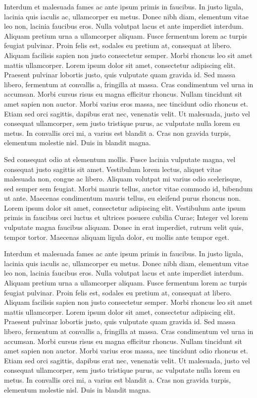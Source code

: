 Interdum et malesuada fames ac ante ipsum primis in faucibus. In justo ligula, 
lacinia quis iaculis ac, ullamcorper eu metus. Donec nibh diam, elementum vitae 
leo non, lacinia faucibus eros. Nulla volutpat lacus et ante imperdiet 
interdum. Aliquam pretium urna a ullamcorper aliquam. Fusce fermentum lorem ac 
turpis feugiat pulvinar. Proin felis est, sodales eu pretium at, consequat at 
libero. Aliquam facilisis sapien non justo consectetur semper. Morbi rhoncus 
leo sit amet mattis ullamcorper.
Lorem ipsum dolor sit amet, consectetur adipiscing elit. Praesent pulvinar 
lobortis justo, quis vulputate quam gravida id. Sed massa libero, fermentum at 
convallis a, fringilla at massa. Cras condimentum vel urna in accumsan. Morbi 
cursus risus eu magna efficitur rhoncus. Nullam tincidunt sit amet sapien non 
auctor. Morbi varius eros massa, nec tincidunt odio rhoncus et. Etiam sed orci 
sagittis, dapibus erat nec, venenatis velit. Ut malesuada, justo vel consequat 
ullamcorper, sem justo tristique purus, ac vulputate nulla lorem eu metus. In 
convallis orci mi, a varius est blandit a. Cras non gravida turpis, elementum 
molestie nisl. Duis in blandit magna.

Sed consequat odio at elementum mollis. Fusce lacinia vulputate magna, vel 
consequat justo sagittis sit amet. Vestibulum lorem lectus, aliquet vitae 
malesuada non, congue ac libero. Aliquam volutpat mi varius odio scelerisque, 
sed semper sem feugiat. Morbi mauris tellus, auctor vitae commodo id, bibendum 
ut ante. Maecenas condimentum mauris tellus, eu eleifend purus rhoncus non. 
Lorem ipsum dolor sit amet, consectetur adipiscing elit. Vestibulum ante ipsum 
primis in faucibus orci luctus et ultrices posuere cubilia Curae; Integer vel 
lorem vulputate magna faucibus aliquam. Donec in erat imperdiet, rutrum velit 
quis, tempor tortor. Maecenas aliquam ligula dolor, eu mollis ante tempor eget.

Interdum et malesuada fames ac ante ipsum primis in faucibus. In justo ligula, 
lacinia quis iaculis ac, ullamcorper eu metus. Donec nibh diam, elementum vitae 
leo non, lacinia faucibus eros. Nulla volutpat lacus et ante imperdiet 
interdum. Aliquam pretium urna a ullamcorper aliquam. Fusce fermentum lorem ac 
turpis feugiat pulvinar. Proin felis est, sodales eu pretium at, consequat at 
libero. Aliquam facilisis sapien non justo consectetur semper. Morbi rhoncus 
leo sit amet mattis ullamcorper.
Lorem ipsum dolor sit amet, consectetur adipiscing elit. Praesent pulvinar 
lobortis justo, quis vulputate quam gravida id. Sed massa libero, fermentum at 
convallis a, fringilla at massa. Cras condimentum vel urna in accumsan. Morbi 
cursus risus eu magna efficitur rhoncus. Nullam tincidunt sit amet sapien non 
auctor. Morbi varius eros massa, nec tincidunt odio rhoncus et. Etiam sed orci 
sagittis, dapibus erat nec, venenatis velit. Ut malesuada, justo vel consequat 
ullamcorper, sem justo tristique purus, ac vulputate nulla lorem eu metus. In 
convallis orci mi, a varius est blandit a. Cras non gravida turpis, elementum 
molestie nisl. Duis in blandit magna.


